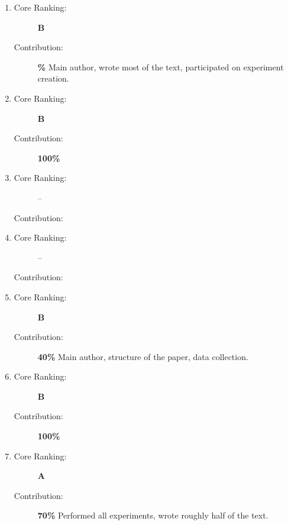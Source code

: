 \begin{enumerate}
  \item {} 
  \begin{description}
    \item[Core Ranking:] \textbf{B}
    \item[Contribution:] \textbf{\%} Main author, wrote most of the text, participated on experiment creation. %
  \end{description}

  \item {} 
  \begin{description}
    \item[Core Ranking:] \textbf{B}
    \item[Contribution:] \textbf{100\%}
  \end{description}

  \item {} 
  \begin{description}
    \item[Core Ranking:] --
    \item[Contribution:] 
  \end{description}
  
  \item {}
  \begin{description}
    \item[Core Ranking:] --
    \item[Contribution:] 
  \end{description}
  
  \item {}
  \begin{description}
    \item[Core Ranking:] \textbf{B}
    \item[Contribution:] \textbf{40\%} Main author, structure of the paper, data collection.
  \end{description}
  
  \item {}
  \begin{description}
    \item[Core Ranking:] \textbf{B}
    \item[Contribution:] \textbf{100\%}
  \end{description}  
  
  \item {}
  \begin{description}
    \item[Core Ranking:] \textbf{A}
    \item[Contribution:] \textbf{70\%} Performed all experiments, wrote roughly half of the text.
  \end{description}
  

\end{enumerate}
